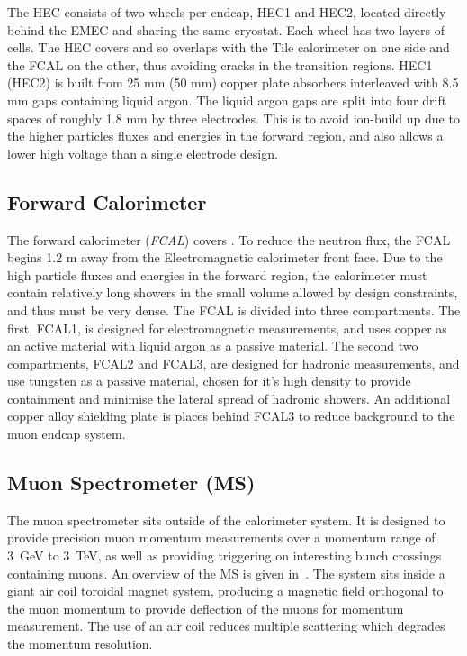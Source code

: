 The HEC consists of two wheels per endcap, HEC1 and HEC2, located directly
behind the EMEC and sharing the same cryostat. Each wheel has two layers of
cells. The HEC covers  and so overlaps with the Tile
calorimeter on one side and the FCAL on the other, thus avoiding cracks in the
transition regions. HEC1 (HEC2) is built from 25 mm (50 mm) copper plate
absorbers interleaved with 8.5 mm gaps containing liquid argon. The liquid
argon gaps are split into four drift spaces of roughly 1.8 mm by three
electrodes. This is to avoid ion-build up due to the higher particles fluxes
and energies in the forward region, and also allows a lower high voltage than a single
electrode design.

\subsection{Forward Calorimeter}

The forward calorimeter ({\it FCAL}) covers . To reduce the
neutron flux, the FCAL begins 1.2 m away from the Electromagnetic calorimeter
front face. Due to the high particle fluxes and energies in the forward region,
the calorimeter must contain relatively long showers in the small volume allowed
by design constraints, and thus must be very dense. The FCAL is divided into
three compartments. The first, FCAL1, is designed for electromagnetic
measurements, and uses copper as an active material with liquid argon as a
passive material. The second two compartments, FCAL2 and FCAL3, are designed for hadronic
measurements, and use tungsten as a passive material, chosen for it's high
density to provide containment and minimise the lateral spread of hadronic
showers. An additional copper alloy shielding plate is places behind FCAL3 to
reduce background to the muon endcap system.

\subsection{Muon Spectrometer (MS)}

The muon spectrometer sits outside of the calorimeter system. It is designed to
provide precision muon momentum measurements over a momentum range of 3~GeV to
3~TeV, as well as providing triggering on interesting bunch crossings containing
muons. An overview of the MS is given in~. The system sits
inside a giant air coil toroidal magnet system, producing a magnetic field
orthogonal to the muon momentum to provide deflection of the
muons for momentum measurement. The use of an air coil reduces multiple
scattering which degrades the momentum resolution.

